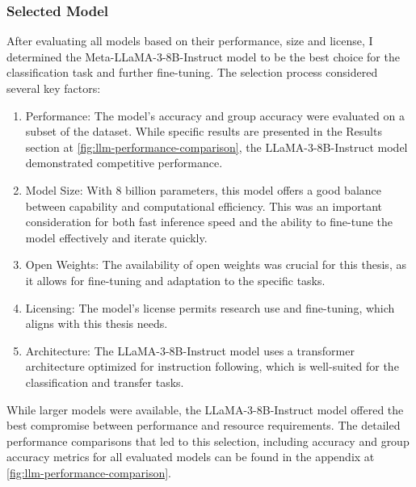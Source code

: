 
\subsubsection*{Selected Model}
\label{sss:selected_model}
After evaluating all models based on their performance, size and license, I determined the Meta-LLaMA-3-8B-Instruct model to be the best choice for the classification task and further fine-tuning. The selection process considered several key factors:

\begin{enumerate}
    \item Performance: The model's accuracy and group accuracy were evaluated on a subset of the dataset. While specific results are presented in the Results section at \ref{fig:llm-performance-comparison}, the LLaMA-3-8B-Instruct model demonstrated competitive performance.
    \item Model Size: With 8 billion parameters, this model offers a good balance between capability and computational efficiency. This was an important consideration for both fast inference speed and the ability to fine-tune the model effectively and iterate quickly.
    \item Open Weights: The availability of open weights was crucial for this thesis, as it allows for fine-tuning and adaptation to the specific tasks.
    \item Licensing: The model's license permits research use and fine-tuning, which aligns with this thesis needs.
    \item Architecture: The LLaMA-3-8B-Instruct model uses a transformer architecture optimized for instruction following, which is well-suited for the classification and transfer tasks.
\end{enumerate}

While larger models were available, the LLaMA-3-8B-Instruct model offered the best compromise between performance and resource requirements. The detailed performance comparisons that led to this selection, including accuracy and group accuracy metrics for all evaluated models can be found in the appendix at \ref{fig:llm-performance-comparison}.

